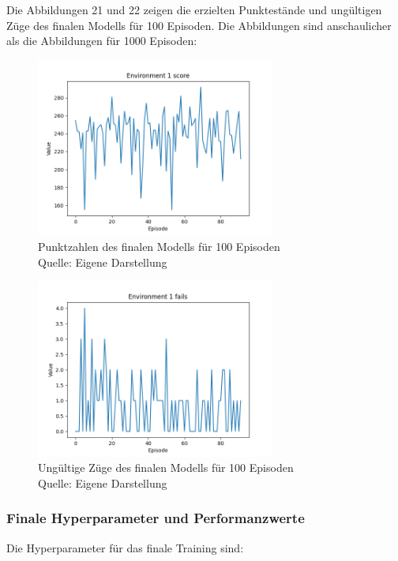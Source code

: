Die Abbildungen 21 und 22 zeigen die erzielten Punktestände und ungültigen Züge des finalen Modells für 100 Episoden. Die Abbildungen sind anschaulicher als die Abbildungen für 1000 Episoden:
\nopagebreak
\begin{figure}[H]
	\centering
	\includegraphics[width=0.7\textwidth]{Bilder/finalp2} 
	\caption[Punktzahlen des finalen Modells für 100 Episoden]{Punktzahlen des finalen Modells für 100 Episoden\\ Quelle: Eigene Darstellung}
\end{figure}
\begin{figure}[H]
	\centering
	\includegraphics[width=0.7\textwidth]{Bilder/finalf2} 
	\caption[Ungültige Züge des finalen Modells für 100 Episoden]{Ungültige Züge des finalen Modells für 100 Episoden\\ Quelle: Eigene Darstellung}
\end{figure}
\subsubsection{Finale Hyperparameter und Performanzwerte}
Die Hyperparameter für das finale Training sind:

